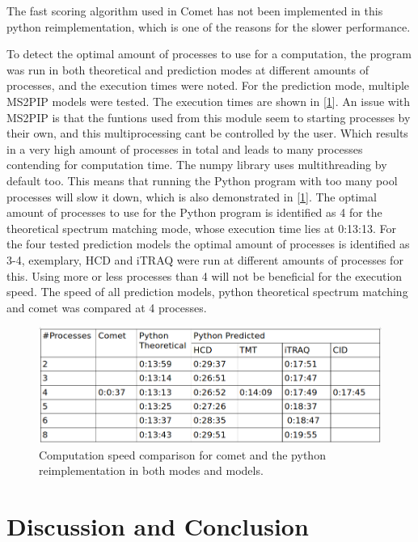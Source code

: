 \documentclass[11pt]{article}
\begin{document}
The fast scoring algorithm used in Comet has not been implemented in this python reimplementation, which is one of the reasons for the slower performance.

To detect the optimal amount of processes to use for a computation, the program was run in both theoretical and prediction modes at different amounts of processes, and the execution times were noted. For the prediction mode, multiple MS2PIP models were tested. The execution times are shown in [\cref{fig:speed-comparison}]. An issue with MS2PIP is that the funtions used from this module seem to starting processes by their own, and this multiprocessing cant be controlled by the user. Which results in a very high amount of processes in total and leads to many processes contending for computation time. The numpy library uses multithreading by default too. This means that running the Python program with too many pool processes will slow it down, which is also demonstrated in [\cref{fig:speed-comparison}]. The optimal amount of processes to use for the Python program is identified as 4 for the theoretical spectrum matching mode, whose execution time lies at 0:13:13. For the four tested prediction models the optimal amount of processes is identified as 3-4, exemplary, HCD and iTRAQ were run at different amounts of processes for this. Using more or less processes than 4 will not be beneficial for the execution speed. The speed of all prediction models, python theoretical spectrum matching and comet was compared at 4 processes.

\begin{figure}
\centering
\includegraphics[width=1\textwidth]{figs/speed-comparison.png}
\caption{Computation speed comparison for comet and the python reimplementation in both modes and models.}
\label{fig:speed-comparison}
\end{figure}

\newpage

\section{Discussion and Conclusion}
\end{document}
